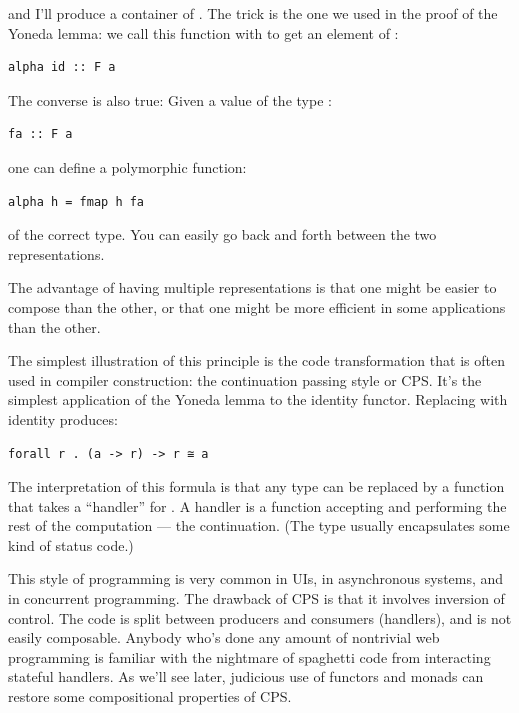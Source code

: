 and I'll produce a container of . The trick is the one we used
in the proof of the Yoneda lemma: we call this function with 
to get an element of :

\begin{verbatim}
alpha id :: F a
\end{verbatim}

The converse is also true: Given a value of the type :

\begin{verbatim}
fa :: F a
\end{verbatim}

one can define a polymorphic function:

\begin{verbatim}
alpha h = fmap h fa
\end{verbatim}

of the correct type. You can easily go back and forth between the two
representations.

The advantage of having multiple representations is that one might be
easier to compose than the other, or that one might be more efficient in
some applications than the other.

The simplest illustration of this principle is the code transformation
that is often used in compiler construction: the continuation passing
style or CPS. It's the simplest application of the Yoneda lemma to the
identity functor. Replacing  with identity produces:

\begin{verbatim}
forall r . (a -> r) -> r ≅ a
\end{verbatim}

The interpretation of this formula is that any type  can be
replaced by a function that takes a ``handler'' for . A
handler is a function accepting  and performing the rest of
the computation --- the continuation. (The type  usually
encapsulates some kind of status code.)

This style of programming is very common in UIs, in asynchronous
systems, and in concurrent programming. The drawback of CPS is that it
involves inversion of control. The code is split between producers and
consumers (handlers), and is not easily composable. Anybody who's done
any amount of nontrivial web programming is familiar with the nightmare
of spaghetti code from interacting stateful handlers. As we'll see
later, judicious use of functors and monads can restore some
compositional properties of CPS.


